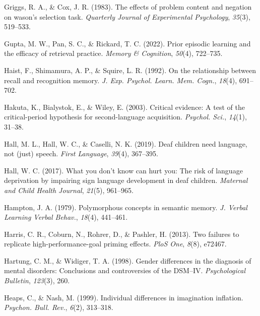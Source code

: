 \documentclass[
]{krantz}
\newlength{\cslhangindent}
\newlength{\cslentryspacingunit} %
\newenvironment{CSLReferences}[2] %
 {%
  \setlength{\parindent}{0pt}
  \ifodd #1
  \let\oldpar\par
  \def\par{\hangindent=\cslhangindent\oldpar}
  \fi
  \setlength{\parskip}{#2\cslentryspacingunit}
 }%
 {}
\begin{document}
\begin{CSLReferences}{1}{0}
\leavevmode{}%
Griggs, R. A., \& Cox, J. R. (1983). The effects of problem content and negation on wason's selection task. \emph{Quarterly Journal of Experimental Psychology}, \emph{35}(3), 519--533.

\leavevmode{}%
Gupta, M. W., Pan, S. C., \& Rickard, T. C. (2022). Prior episodic learning and the efficacy of retrieval practice. \emph{Memory \& Cognition}, \emph{50}(4), 722--735.

\leavevmode{}%
Haist, F., Shimamura, A. P., \& Squire, L. R. (1992). On the relationship between recall and recognition memory. \emph{J. Exp. Psychol. Learn. Mem. Cogn.}, \emph{18}(4), 691--702.

\leavevmode{}%
Hakuta, K., Bialystok, E., \& Wiley, E. (2003). Critical evidence: A test of the critical-period hypothesis for second-language acquisition. \emph{Psychol. Sci.}, \emph{14}(1), 31--38.

\leavevmode{}%
Hall, M. L., Hall, W. C., \& Caselli, N. K. (2019). Deaf children need language, not (just) speech. \emph{First Language}, \emph{39}(4), 367--395.

\leavevmode{}%
Hall, W. C. (2017). What you don't know can hurt you: The risk of language deprivation by impairing sign language development in deaf children. \emph{Maternal and Child Health Journal}, \emph{21}(5), 961--965.

\leavevmode{}%
Hampton, J. A. (1979). Polymorphous concepts in semantic memory. \emph{J. Verbal Learning Verbal Behav.}, \emph{18}(4), 441--461.

\leavevmode{}%
Harris, C. R., Coburn, N., Rohrer, D., \& Pashler, H. (2013). Two failures to replicate high-performance-goal priming effects. \emph{PloS One}, \emph{8}(8), e72467.

\leavevmode{}%
Hartung, C. M., \& Widiger, T. A. (1998). Gender differences in the diagnosis of mental disorders: Conclusions and controversies of the DSM--IV. \emph{Psychological Bulletin}, \emph{123}(3), 260.

\leavevmode{}%
Heaps, C., \& Nash, M. (1999). Individual differences in imagination inflation. \emph{Psychon. Bull. Rev.}, \emph{6}(2), 313--318.


\end{CSLReferences}
\end{document}

